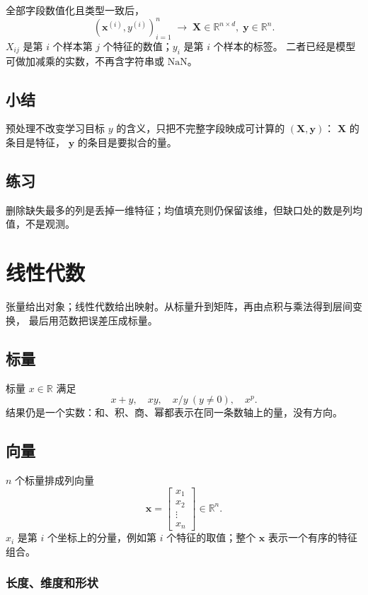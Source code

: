 全部字段数值化且类型一致后，
\[
(\bm{x}^{(i)},y^{(i)})_{i=1}^{n}
\;\longrightarrow\;
\bm{X}\in\mathbb{R}^{n\times d},
\;
\bm{y}\in\mathbb{R}^{n}.
\]
$X_{ij}$ 是第 $i$ 个样本第 $j$ 个特征的数值；$y_i$ 是第 $i$ 个样本的标签。
二者已经是模型可做加减乘的实数，不再含字符串或 $\mathrm{NaN}$。

\subsection{小结}

预处理不改变学习目标 $y$ 的含义，只把不完整字段映成可计算的 $(\bm{X},\bm{y})$：
$\bm{X}$ 的条目是特征， $\bm{y}$ 的条目是要拟合的量。

\subsection{练习}

删除缺失最多的列是丢掉一维特征；均值填充则仍保留该维，但缺口处的数是列均值，不是观测。

\section{线性代数}

张量给出对象；线性代数给出映射。从标量升到矩阵，再由点积与乘法得到层间变换，
最后用范数把误差压成标量。

\subsection{标量}

标量 $x\in\mathbb{R}$ 满足
\[
x+y,\quad xy,\quad x/y\ (y\neq 0),\quad x^{p}.
\]
结果仍是一个实数：和、积、商、幂都表示在同一条数轴上的量，没有方向。

\subsection{向量}

$n$ 个标量排成列向量
\[
\bm{x}=
\begin{bmatrix}
x_1\\x_2\\\vdots\\x_n
\end{bmatrix}
\in\mathbb{R}^{n}.
\]
$x_i$ 是第 $i$ 个坐标上的分量，例如第 $i$ 个特征的取值；整个 $\bm{x}$ 表示一个有序的特征组合。

\subsubsection{长度、维度和形状}


